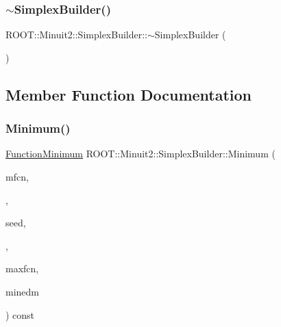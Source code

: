 \mbox{\label{classROOT_1_1Minuit2_1_1SimplexBuilder_a2559aceabff61d3361e5750aa6b97f73}} 
\subsubsection{\texorpdfstring{$\sim$SimplexBuilder()}{~SimplexBuilder()}\hspace{0.1cm}{\footnotesize\ttfamily [3/3]}}
{\footnotesize\ttfamily R\+O\+O\+T\+::\+Minuit2\+::\+Simplex\+Builder\+::$\sim$\+Simplex\+Builder (\begin{DoxyParamCaption}{ }\end{DoxyParamCaption})\hspace{0.3cm}{\ttfamily [inline]}}



\subsection{Member Function Documentation}
\mbox{\label{classROOT_1_1Minuit2_1_1SimplexBuilder_a82c52765929e3f4a41b1abe1473d4140}} 
\subsubsection{\texorpdfstring{Minimum()}{Minimum()}\hspace{0.1cm}{\footnotesize\ttfamily [1/3]}}
{\footnotesize\ttfamily \mbox{\hyperlink{classROOT_1_1Minuit2_1_1FunctionMinimum}{Function\+Minimum}} R\+O\+O\+T\+::\+Minuit2\+::\+Simplex\+Builder\+::\+Minimum (\begin{DoxyParamCaption}\item[{const \mbox{\hyperlink{classROOT_1_1Minuit2_1_1MnFcn}{Mn\+Fcn}} \&}]{mfcn,  }\item[{const \mbox{\hyperlink{classROOT_1_1Minuit2_1_1GradientCalculator}{Gradient\+Calculator}} \&}]{,  }\item[{const \mbox{\hyperlink{classROOT_1_1Minuit2_1_1MinimumSeed}{Minimum\+Seed}} \&}]{seed,  }\item[{const \mbox{\hyperlink{classROOT_1_1Minuit2_1_1MnStrategy}{Mn\+Strategy}} \&}]{,  }\item[{unsigned int}]{maxfcn,  }\item[{double}]{minedm }\end{DoxyParamCaption}) const\hspace{0.3cm}{\ttfamily [virtual]}}



